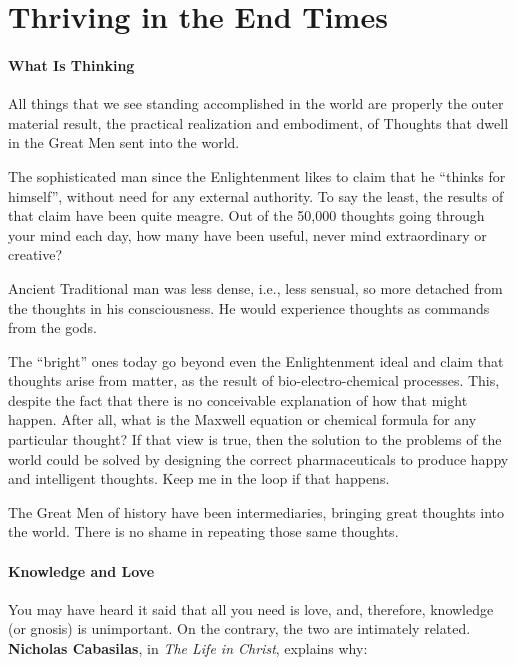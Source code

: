 \section{Thriving in the End Times}

\paragraph{What Is Thinking}


\begin{quotex}
All things that we see standing accomplished in the world are properly the outer material result, the practical realization and embodiment, of Thoughts that dwell in the Great Men sent into the world.
\end{quotex}


The sophisticated man since the Enlightenment likes to claim that he ``thinks for himself'', without need for any external authority. To say the least, the results of that claim have been quite meagre. Out of the 50,000 thoughts going through your mind each day, how many have been useful, never mind extraordinary or creative?

Ancient Traditional man was less dense, i.e., less sensual, so more detached from the thoughts in his consciousness. He would experience thoughts as commands from the gods.

The ``bright'' ones today go beyond even the Enlightenment ideal and claim that thoughts arise from matter, as the result of bio-electro-chemical processes. This, despite the fact that there is no conceivable explanation of how that might happen. After all, what is the Maxwell equation or chemical formula for any particular thought? If that view is true, then the solution to the problems of the world could be solved by designing the correct pharmaceuticals to produce happy and intelligent thoughts. Keep me in the loop if that happens.

The Great Men of history have been intermediaries, bringing great thoughts into the world. There is no shame in repeating those same thoughts.

\paragraph{Knowledge and Love}


You may have heard it said that all you need is love, and, therefore, knowledge (or gnosis) is unimportant. On the contrary, the two are intimately related. \textbf{Nicholas Cabasilas}, in \emph{The Life in Christ}, explains why:

